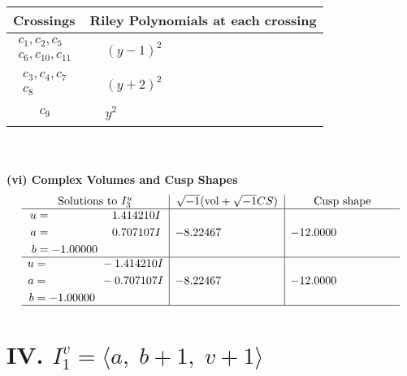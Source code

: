 \documentclass[1p]{elsarticle_modified}
\theoremstyle{definition}
\newcommand{\I}{\sqrt{-1}}
\begin{document}
\begin{tabular}{m{50pt}|m{274pt}}
Crossings & \hspace{64pt}Riley Polynomials at each crossing \\
\hline $$\begin{aligned}c_{1},c_{2},c_{5}\\c_{6},c_{10},c_{11}\end{aligned}$$&$\begin{aligned}
&(y-1)^2
\end{aligned}$\\
\hline $$\begin{aligned}c_{3},c_{4},c_{7}\\c_{8}\end{aligned}$$&$\begin{aligned}
&(y+2)^2
\end{aligned}$\\
\hline $$\begin{aligned}c_{9}\end{aligned}$$&$\begin{aligned}
&y^2
\end{aligned}$\\
\hline
\end{tabular}\\~\\
\newpage\flushleft \textbf{(vi) Complex Volumes and Cusp Shapes}
$$\begin{array}{c|c|c}  
\text{Solutions to }I^u_{3}& \I (\text{vol} + \sqrt{-1}CS) & \text{Cusp shape}\\
 \hline 
\begin{aligned}
u &= \phantom{-0.000000 -}1.414210 I \\
a &= \phantom{-0.000000 -}0.707107 I \\
b &= -1.00000\phantom{ +0.000000I}\end{aligned}
 & -8.22467\phantom{ +0.000000I} & -12.0000\phantom{ +0.000000I} \\ \hline\begin{aligned}
u &= \phantom{-0.000000 } -1.414210 I \\
a &= \phantom{-0.000000 } -0.707107 I \\
b &= -1.00000\phantom{ +0.000000I}\end{aligned}
 & -8.22467\phantom{ +0.000000I} & -12.0000\phantom{ +0.000000I}\\
 \hline 
 \end{array}$$\newpage\newpage\renewcommand{\arraystretch}{1}
\centering \section*{IV. $I^v_{1}= \langle a,\;b+1,\;v+1 \rangle$}
\end{document}
